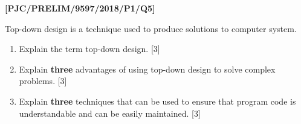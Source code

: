 \item \textbf{{[}PJC/PRELIM/9597/2018/P1/Q5{]} }

Top-down design is a technique used to produce solutions to computer
system. 
\begin{enumerate}
\item Explain the term top-down design. \hfill{}{[}3{]}
\item Explain \textbf{three} advantages of using top-down design to solve
complex problems.\hfill{} {[}3{]}
\item Explain \textbf{three} techniques that can be used to ensure that
program code is understandable and can be easily maintained. \hfill{}{[}3{]}
\end{enumerate}